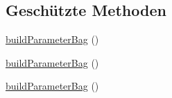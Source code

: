 \subsection*{Geschützte Methoden}
\begin{DoxyCompactItemize}
\item 
\mbox{\hyperlink{class_eluceo_1_1i_cal_1_1_property_1_1_event_1_1_recurrence_rule_ad1be91dbdcb26d1f931a17758780b2a5}{build\+Parameter\+Bag}} ()
\item 
\mbox{\hyperlink{class_eluceo_1_1i_cal_1_1_property_1_1_event_1_1_recurrence_rule_ad1be91dbdcb26d1f931a17758780b2a5}{build\+Parameter\+Bag}} ()
\item 
\mbox{\hyperlink{class_eluceo_1_1i_cal_1_1_property_1_1_event_1_1_recurrence_rule_ad1be91dbdcb26d1f931a17758780b2a5}{build\+Parameter\+Bag}} ()
\end{DoxyCompactItemize}
